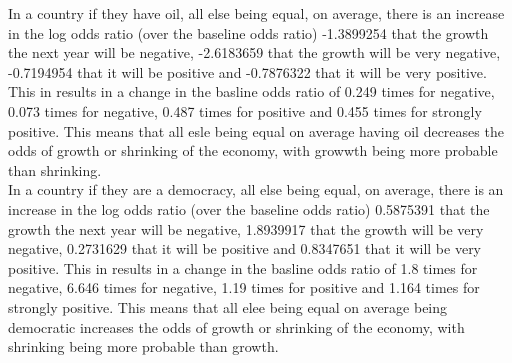 \documentclass{article}
\begin{document}
In a country if they have oil, all else being equal, on average, there is an increase in the log odds ratio (over the baseline odds ratio) -1.3899254 that the growth the next year will be negative, -2.6183659 that the growth will be very negative, -0.7194954 that it will be positive and -0.7876322 that it will be very positive. This in results in a change in the basline odds ratio of 0.249 times for negative, 0.073 times for negative, 0.487 times for positive and 0.455 times for strongly positive. This means that all esle being equal on average having oil decreases the odds of growth or shrinking of the economy, with growwth being more probable than shrinking.\\

In a country if they are a democracy, all else being equal, on average, there is an increase in the log odds ratio (over the baseline odds ratio) 0.5875391 that the growth the next year will be negative, 1.8939917 that the growth will be very negative, 0.2731629 that it will be positive and 0.8347651 that it will be very positive. This in results in a change in the basline odds ratio of 1.8 times for negative, 6.646 times for negative, 1.19 times for positive and 1.164 times for strongly positive. This means that all elee being equal on average being democratic increases the odds of growth or shrinking of the economy, with shrinking being more probable than growth.\\
	\vspace{10mm}
	
\end{document}
